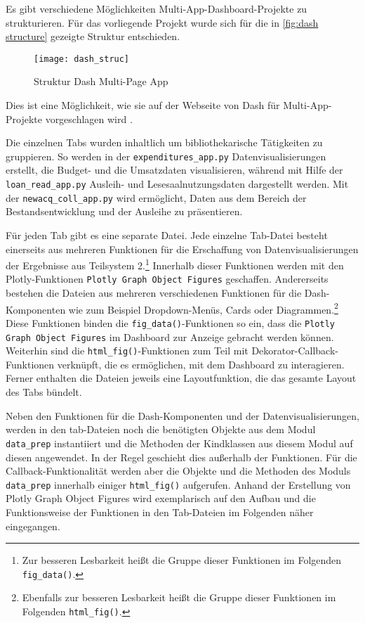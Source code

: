     Es gibt verschiedene Möglichkeiten Multi-App-Dashboard-Projekte zu strukturieren. Für das vorliegende Projekt wurde sich für die in 
    \autoref{fig:dash structure} gezeigte Struktur entschieden.

    \begin{figure}[H]
        \centering
            \texttt{[image: dash\_struc]}
            \caption{Struktur Dash Multi-Page App}
            \label{fig:dash structure}
    \end{figure}
    
    Dies ist eine Möglichkeit, wie sie auf der Webseite von Dash für Multi-App-Projekte vorgeschlagen wird \cite[vgl.][]{plotly_url_2021}.
    
    Die einzelnen Tabs wurden inhaltlich um bibliothekarische Tätigkeiten zu gruppieren. So werden in der \texttt{expenditures\_app.py}
    Datenvisualisierungen erstellt, die Budget- und die Umsatzdaten visualisieren, während mit Hilfe der \texttt{loan\_read\_app.py}
    Ausleih- und Lesesaalnutzungsdaten dargestellt werden. Mit der \texttt{newacq\_coll\_app.py} wird ermöglicht, Daten aus dem Bereich der Bestandsentwicklung und der 
    Ausleihe zu präsentieren.

    Für jeden Tab gibt es eine separate Datei. Jede einzelne Tab-Datei besteht einerseits aus mehreren Funktionen für die Erschaffung von Datenvisualisierungen der
    Ergebnisse aus Teilsystem 2.\footnote{Zur besseren Lesbarkeit heißt die Gruppe dieser Funktionen im Folgenden \texttt{fig\_data()}.}
    Innerhalb dieser Funktionen werden mit den Plotly-Funktionen \texttt{Plotly Graph Object Figures} geschaffen. 
    Andererseits bestehen die Dateien aus mehreren verschiedenen Funktionen für die Dash-Komponenten wie zum Beispiel Dropdown-Menüs, Cards oder Diagrammen.\footnote{Ebenfalls zur besseren Lesbarkeit
    heißt die Gruppe dieser Funktionen im Folgenden \texttt{html\_fig()}.}
    Diese Funktionen binden die \texttt{fig\_data()}-Funktionen so ein, dass die \texttt{Plotly Graph Object Figures} im Dashboard zur Anzeige gebracht werden können. 
    Weiterhin sind die \texttt{html\_fig()}-Funktionen zum Teil mit Dekorator-Callback-Funktionen verknüpft, die es ermöglichen, mit dem Dashboard zu interagieren. 
    Ferner enthalten die Dateien jeweils eine Layoutfunktion, die das gesamte Layout des
    Tabs bündelt.

    Neben den Funktionen für die Dash-Komponenten und der Datenvisualisierungen, werden in den tab-Dateien noch die benötigten Objekte aus dem Modul \texttt{data\_prep} 
    instantiiert und die Methoden der Kindklassen aus diesem Modul auf diesen angewendet. In der Regel geschieht dies außerhalb der Funktionen.
    Für die Callback-Funktionalität werden aber die Objekte und die Methoden des Moduls \texttt{data\_prep} innerhalb einiger \texttt{html\_fig()} aufgerufen.
    Anhand der Erstellung von Plotly Graph Object Figures wird exemplarisch auf den Aufbau und die Funktionsweise der Funktionen in den Tab-Dateien im Folgenden näher eingegangen.

